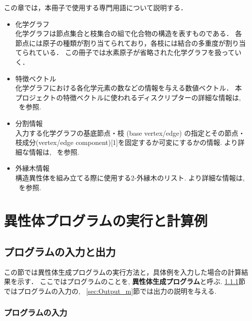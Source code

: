 \documentclass[11pt,titlepage,dvipdfmx,twoside]{jarticle}
\begin{document}
この章では，本冊子で使用する専門用語について説明する．
%
\begin{itemize}
%
\item 化学グラフ\\
	化学グラフは節点集合と枝集合の組で化合物の構造を表すものである．
	各節点には原子の種類が割り当てられており，各枝には結合の多重度が割り当てられている．
	この冊子では水素原子が省略された化学グラフを扱っていく．


\item 特徴ベクトル\\
化学グラフにおける各化学元素の数などの情報を与える数値ベクトル．
本プロジェクトの特徴ベクトルに使われるディスクリプターの詳細な情報は, ~\cite{branch}を参照.


\item 分割情報\\
入力する化学グラフの基底節点・枝 (base vertex/edge) の指定とその節点・枝成分(vertex/edge component)[1]を固定するか可変にするかの情報.
より詳細な情報は, ~\cite{branch}を参照.

\item 外縁木情報\\
構造異性体を組み立てる際に使用する2-外縁木のリスト.
より詳細な情報は, ~\cite{branch}を参照.


\end{itemize}


\section{異性体プログラムの実行と計算例}
\label{sec: main}

\subsection{プログラムの入力と出力}
\label{sec:InOut_m}

この節では異性体生成プログラムの実行方法と，具体例を入力した場合の計算結果を示す．
ここではプログラムのことを, {\bf 異性体生成プログラム}と呼ぶ.
\ref{sec:Input_m}節ではプログラムの入力の, ~\ref{sec:Output_m}節では出力の説明を与える.


\subsubsection{プログラムの入力}
\label{sec:Input_m}
\end{document}
